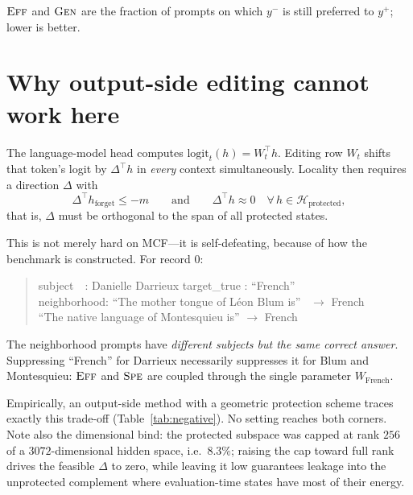 \documentclass[11pt]{article}
\newcommand{\Eff}{\textsc{Eff}}
\newcommand{\Gen}{\textsc{Gen}}
\newcommand{\Spe}{\textsc{Spe}}
\begin{document}
\noindent
$\Eff$ and $\Gen$ are the fraction of prompts on which $y^{-}$ is still
preferred to $y^{+}$; lower is better.

\section{Why output-side editing cannot work here}
\label{sec:negative}

The language-model head computes $\mathrm{logit}_t(h) = W_t^\top h$. Editing
row $W_t$ shifts that token's logit by $\Delta^\top h$ in \emph{every} context
simultaneously. Locality then requires a direction $\Delta$ with
\begin{equation}
\Delta^\top h_{\text{forget}} \le -m
\qquad\text{and}\qquad
\Delta^\top h \approx 0 \quad \forall\, h \in \mathcal{H}_{\text{protected}} ,
\end{equation}
that is, $\Delta$ must be orthogonal to the span of all protected states.

This is not merely hard on MCF---it is self-defeating, because of how the
benchmark is constructed. For record $0$:

\begin{quote}\ttfamily\small
subject\quad\ \ : Danielle Darrieux \qquad target\_true : ``French''\\
neighborhood: ``The mother tongue of L\'eon Blum is'' \ $\rightarrow$ French\\
\phantom{neighborhood:} ``The native language of Montesquieu is'' $\rightarrow$ French
\end{quote}

\noindent
The neighborhood prompts have \emph{different subjects but the same correct
answer}. Suppressing ``French'' for Darrieux necessarily suppresses it for Blum
and Montesquieu: $\Eff$ and $\Spe$ are coupled through the single parameter
$W_{\text{French}}$.

Empirically, an output-side method with a geometric protection scheme traces
exactly this trade-off (Table~\ref{tab:negative}). No setting reaches both
corners. Note also the dimensional bind: the protected subspace was capped at
rank $256$ of a $3072$-dimensional hidden space, i.e.\ $8.3\%$; raising the cap
toward full rank drives the feasible $\Delta$ to zero, while leaving it low
guarantees leakage into the unprotected complement where evaluation-time states
have most of their energy.
\end{document}
